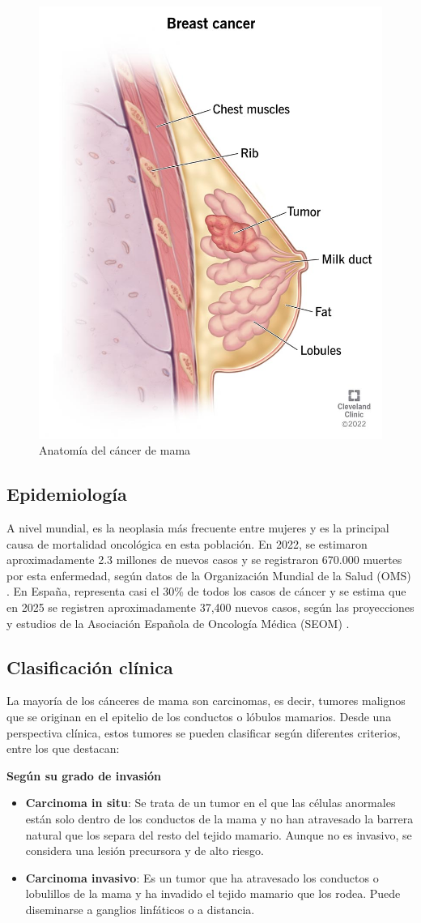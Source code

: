 \documentclass[a4paper,10pt]{book}
\begin{document}
\begin{figure}[h]
    \centering
    \includegraphics[width=0.3\linewidth]{reports//assets/bc.jpg}
    \caption{Anatomía del cáncer de mama \cite{cleveland_clinic_breast_2023}}
    \label{fig:breast-cancer-anatomy}
\end{figure}

\subsection{Epidemiología}

A nivel mundial, es la neoplasia más frecuente entre mujeres y es la principal causa de mortalidad oncológica en esta población. En 2022, se estimaron aproximadamente 2.3 millones de nuevos casos y se registraron 670.000 muertes por esta enfermedad, según datos de la Organización Mundial de la Salud (OMS) \cite{who_breast_2024}. En España, representa casi el 30\% de todos los casos de cáncer y se estima que en 2025 se registren aproximadamente 37,400 nuevos casos, según las proyecciones y estudios de la Asociación Española de Oncología Médica (SEOM) \cite{seom_cancer_nodate}.

\subsection{Clasificación clínica}

La mayoría de los cánceres de mama son carcinomas, es decir, tumores malignos que se originan en el epitelio de los conductos o lóbulos mamarios. Desde una perspectiva clínica, estos tumores se pueden clasificar según diferentes criterios, entre los que destacan:

\textbf{Según su grado de invasión}
\begin{itemize}
    \item \textbf{Carcinoma in situ}: Se trata de un tumor en el que las células anormales están solo dentro de los conductos de la mama y no han atravesado la barrera natural que los separa del resto del tejido mamario. Aunque no es invasivo, se considera una lesión precursora y de alto riesgo.
    \item \textbf{Carcinoma invasivo}: Es un tumor que ha atravesado los conductos o lobulillos de la mama y ha invadido el tejido mamario que los rodea. Puede diseminarse a ganglios linfáticos o a distancia.
\end{itemize}
\end{document}
